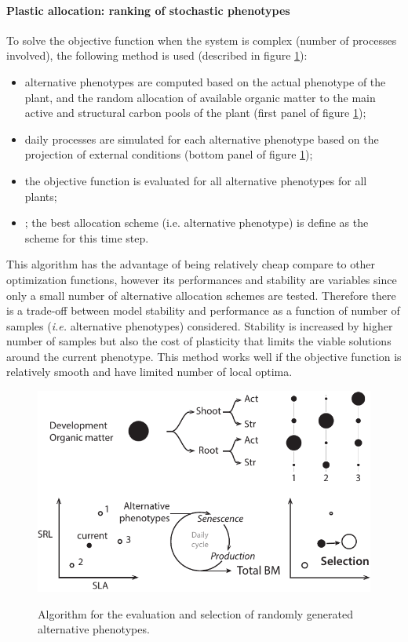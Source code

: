 \documentclass[a4paper,twoside, justified,marginals=raggedright, nobib]{tufte-handout}
\begin{document}
\paragraph{Plastic allocation: ranking of stochastic phenotypes}
To solve the objective function when the system is complex (number of processes involved), the following method is used (described in figure \ref{fig:alloc_algo}):
\begin{itemize}
\item alternative phenotypes are computed based on the actual phenotype of the plant, and the random allocation of available organic matter to the main active and structural carbon pools of the plant (first panel of figure \ref{fig:alloc_algo});\\
\item daily processes are simulated for each alternative phenotype based on the projection of external conditions (bottom panel of figure \ref{fig:alloc_algo});\\
\item the objective function is evaluated for all alternative phenotypes for all plants;
\item; the best allocation scheme (i.e. alternative phenotype) is define as the scheme for this time step.
\end{itemize}
This algorithm has the advantage of being relatively cheap compare to other optimization functions, however its performances and stability are variables since only a small number of alternative allocation schemes are tested. Therefore there is a trade-off between model stability and performance as a function of number of samples (\textit{i.e.} alternative phenotypes) considered. Stability is increased by higher number of samples but also the cost of plasticity that limits the viable solutions around the current phenotype. This method works well if the objective function is relatively smooth and have limited number of local optima.
\begin{figure}
\includegraphics{./Figures/phenotype_ranking_t.pdf}
\label{fig:alloc_algo}
\caption{Algorithm for the evaluation and selection of randomly generated alternative phenotypes.}
\end{figure}
\end{document}
